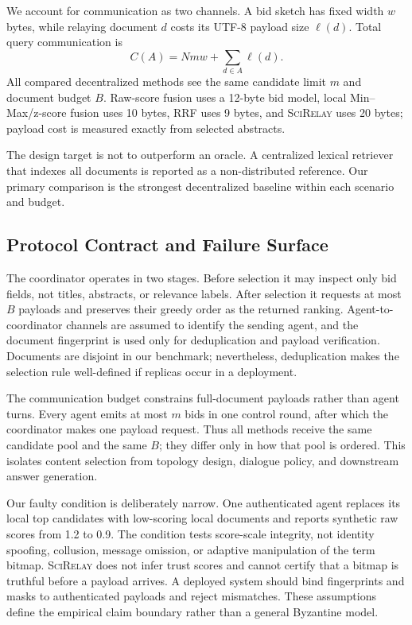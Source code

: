 \documentclass[sigconf]{acmart}
\newcommand{\method}{\textsc{SciRelay}}
\begin{document}
We account for communication as two channels. A bid sketch has fixed width $w$ bytes, while relaying document $d$ costs its UTF-8 payload size $\ell(d)$. Total query communication is
\begin{equation}
 C(A)=N m w+\sum_{d\in A}\ell(d).
\end{equation}
All compared decentralized methods see the same candidate limit $m$ and document budget $B$. Raw-score fusion uses a 12-byte bid model, local Min--Max/z-score fusion uses 10 bytes, RRF uses 9 bytes, and \method{} uses 20 bytes; payload cost is measured exactly from selected abstracts.

The design target is not to outperform an oracle. A centralized lexical retriever that indexes all documents is reported as a non-distributed reference. Our primary comparison is the strongest decentralized baseline within each scenario and budget.

\subsection{Protocol Contract and Failure Surface}

The coordinator operates in two stages. Before selection it may inspect only bid fields, not titles, abstracts, or relevance labels. After selection it requests at most $B$ payloads and preserves their greedy order as the returned ranking. Agent-to-coordinator channels are assumed to identify the sending agent, and the document fingerprint is used only for deduplication and payload verification. Documents are disjoint in our benchmark; nevertheless, deduplication makes the selection rule well-defined if replicas occur in a deployment.

The communication budget constrains full-document payloads rather than agent turns. Every agent emits at most $m$ bids in one control round, after which the coordinator makes one payload request. Thus all methods receive the same candidate pool and the same $B$; they differ only in how that pool is ordered. This isolates content selection from topology design, dialogue policy, and downstream answer generation.

Our faulty condition is deliberately narrow. One authenticated agent replaces its local top candidates with low-scoring local documents and reports synthetic raw scores from 1.2 to 0.9. The condition tests score-scale integrity, not identity spoofing, collusion, message omission, or adaptive manipulation of the term bitmap. \method{} does not infer trust scores and cannot certify that a bitmap is truthful before a payload arrives. A deployed system should bind fingerprints and masks to authenticated payloads and reject mismatches. These assumptions define the empirical claim boundary rather than a general Byzantine model.
\end{document}
